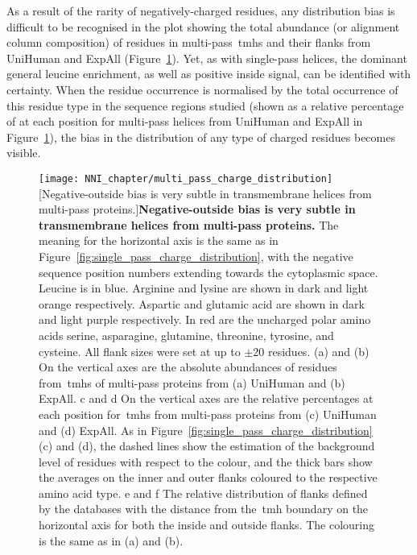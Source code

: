 As a result of the rarity of negatively\--charged residues, any distribution bias is difficult to be recognised in the plot showing the total abundance (or alignment column composition) of residues in multi\--pass~\gls{tmh}s and their flanks from UniHuman and ExpAll (Figure~\ref{fig:multi_pass_charge_distribution}).
Yet, as with single\--pass helices, the dominant general leucine enrichment, as well as positive inside signal, can be identified with certainty.
When the residue occurrence is normalised by the total occurrence of this residue type in the sequence regions studied (shown as a relative percentage of at each position for multi\--pass helices from UniHuman and ExpAll  in Figure~\ref{fig:multi_pass_charge_distribution}), the bias in the distribution of any type of charged residues becomes visible.

\begin{figure}[!p]
\centering
\texttt{[image: NNI\_chapter/multi\_pass\_charge\_distribution]}
[Negative-outside bias is very subtle in transmembrane helices from multi\--pass proteins.]{\textbf{Negative-outside bias is very subtle in transmembrane helices from multi\--pass proteins.} The meaning for the horizontal axis is the same as in Figure~\ref{fig:single_pass_charge_distribution}, with the negative sequence position numbers extending towards the cytoplasmic space.
Leucine is in blue.
Arginine and lysine are shown in dark and light orange respectively.
Aspartic and glutamic acid are shown in dark and light purple respectively.
In red are the uncharged polar amino acids serine, asparagine, glutamine, threonine, tyrosine, and cysteine.
All flank sizes were set at up to $\pm$20 residues.
(a) and (b) On the vertical axes are the absolute abundances of residues from~\gls{tmh}s of multi\--pass proteins from (a) UniHuman and (b) ExpAll.
c and d On the vertical axes are the relative percentages at each position for~\gls{tmh}s from multi\--pass proteins from (c) UniHuman and (d) ExpAll.
As in Figure~\ref{fig:single_pass_charge_distribution}(c) and (d), the dashed lines show the estimation of the background level of residues with respect to the colour, and the thick bars show the averages on the inner and outer flanks coloured to the respective amino acid type.
e and f The relative distribution of flanks defined by the databases with the distance from the~\gls{tmh} boundary on the horizontal axis for both the inside and outside flanks.
The colouring is the same as in (a) and (b).}

\label{fig:multi_pass_charge_distribution}
\end{figure}

